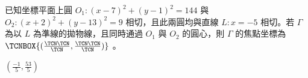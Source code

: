 \begin{QUESTIONS}
\begin{QUESTION}
\begin{ExamAnsRateInfo}{10}{29}{1}{0}
        \end{ExamAnsRateInfo}
        \begin{QBODY}
            已知坐標平面上圓 $O_1 :(x-7)^2 +(y-1)^2 =144$ 與 $O_2 : (x+2)^2 +(y-13)^2 =9$ 相切，且此兩圓均與直線 $L:	x = -5$ 相切。若 $\Gamma$ 為以 $L$ 為準線的拋物線，且同時通過 $O_1$ 與 $O_2$ 的圓心，則 $\Gamma$ 的焦點坐標為 
$\TCNBOX{(\frac{\TCN\TCN}{\TCN},\frac{\TCN\TCN}{\TCN})}$ 。
        \end{QBODY}
        \begin{QFROMS}
        \end{QFROMS}
        \begin{QTAGS}\end{QTAGS}
        \begin{QANS}
            $(\frac{-1}{5},\frac{53}{5})$
        \end{QANS}
        \begin{QSOLLIST}
        \end{QSOLLIST}
        \begin{QEMPTYSPACE}
        \end{QEMPTYSPACE}
    \end{QUESTION}
\end{QUESTIONS}
